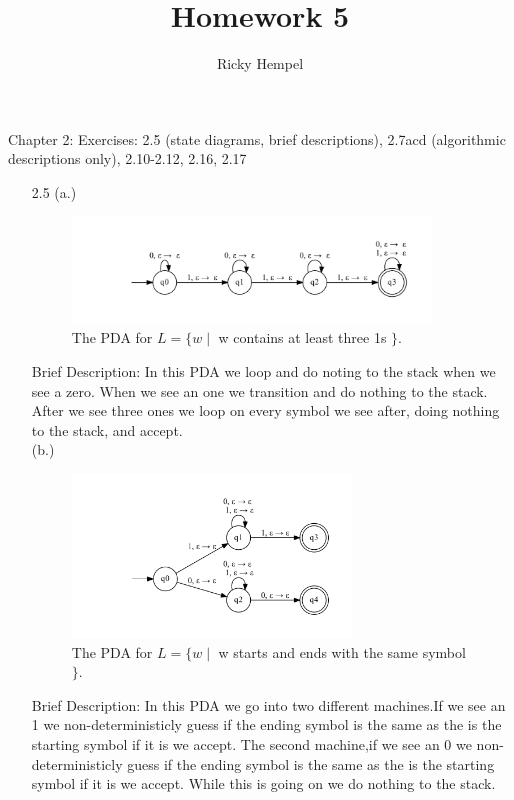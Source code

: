 \documentclass[10pt] {article}
\title{Homework 5 }
\author{Ricky Hempel}
\begin{document}
\maketitle
\begin{center}
Chapter 2:
Exercises: 2.5 (state diagrams, brief descriptions),
2.7acd (algorithmic descriptions only),
2.10-2.12, 2.16, 2.17
\end{center}
\begin{enumerate}
\item[2.5] (a.)
\begin{figure}[H]
\includegraphics[width=0.9\textwidth]{a25.pdf}
\caption{The PDA for $L=\{w \mid$ w contains at least three 1s $\}$.}
\label{1}
\end{figure}
Brief Description: In this PDA we loop and do noting to the stack when we see a zero. When we see an one we transition and do nothing to the stack. After we see  three ones we loop on every symbol we see after, doing nothing to the stack, and accept.    \\
(b.)  
\begin{figure}[H]
\includegraphics[width=0.7\textwidth]{b25.pdf}
\caption{The PDA for $L=\{w \mid$ w starts and ends with the same symbol $\}$.}
\label{2}
\end{figure}
Brief Description: In this PDA we go into two different machines.If we see an 1 we non-deterministicly guess if the ending symbol is the same as the is the starting symbol if it is we accept. The second machine,if we see an 0 we non-deterministicly guess if the ending symbol is the same as the is the starting symbol if it is we accept. While this is going on we do nothing to the stack.\\

\end{enumerate}
\end{document}
